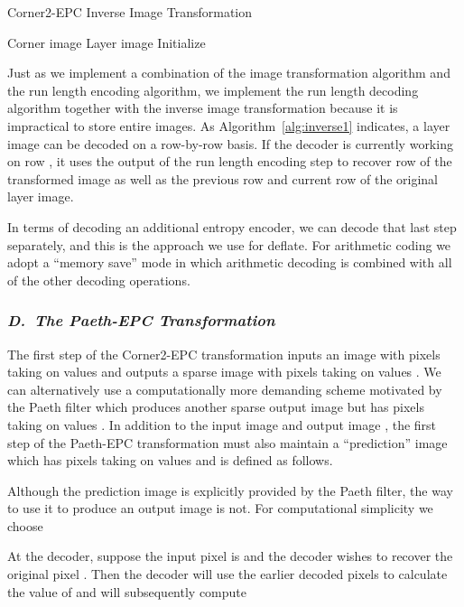 \documentclass{article}
\begin{document}
\begin{algorithm}[!htb]
\caption{Corner2-EPC Inverse Image Transformation}
\label{alg:inverse1}
\begin{algorithmic}[1]
\renewcommand{\algorithmicrequire} {\textbf{Input:}}
\REQUIRE Corner image 
\renewcommand{\algorithmicrequire} {\textbf{Output:}}
\REQUIRE Layer image 
\STATE Initialize 
\FOR { \TO } 
        \STATE 
\ENDFOR
\FOR { \TO }
        \STATE 
        \FOR { \TO }
        \STATE 
        \ENDFOR
\ENDFOR
\end{algorithmic}
\end{algorithm}

Just as we implement a combination of the image transformation algorithm
and the run length encoding algorithm, we implement the run length decoding
algorithm together with the inverse image transformation because it is
impractical to store entire images.  As Algorithm~\ref{alg:inverse1} indicates,
a layer image can be decoded on a row-by-row basis.  If the decoder
is currently working on row , it uses the output of the run length
encoding step to recover row  of the transformed image as well as the
previous row and current row of the original layer image.

In terms of decoding an additional entropy encoder, we can decode that
last step separately, and this is the approach we use for deflate.
For arithmetic coding we adopt a ``memory save'' mode in which arithmetic
decoding  is combined with all of the other decoding operations.

\subsubsection*{{\em D.~The Paeth-EPC Transformation}}
The first step of the Corner2-EPC transformation inputs an image with
pixels taking on values 
and outputs a sparse image with pixels taking on values
.
We can alternatively use a computationally more demanding scheme motivated
by the Paeth filter which produces another sparse output image but
has pixels taking on values .
In addition to the input image  and output image 
, the first step of the Paeth-EPC transformation
must also maintain a ``prediction'' image  which
has pixels taking on values  and is defined as
follows.

Although the prediction image is explicitly provided by the Paeth filter,
the way to use it to produce an output image is not.  For computational
simplicity we choose


At the decoder, suppose the input pixel is 
and the decoder wishes to recover the original pixel  .
Then the decoder will use the earlier decoded pixels  to
calculate the value of  and will subsequently compute
\end{document}
